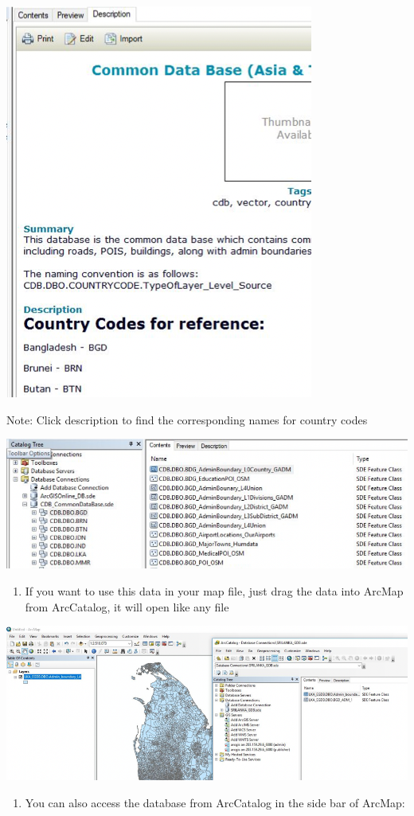 \documentclass[]{book}
\providecommand{\tightlist}{%
  \setlength{\itemsep}{0pt}\setlength{\parskip}{0pt}}
\theoremstyle{definition}
\theoremstyle{definition}
\theoremstyle{definition}
\theoremstyle{remark}
\begin{document}
\begin{center}\includegraphics[width=0.4\linewidth]{img/fig43_arcgis8b} \end{center}

Note: Click description to find the corresponding names for country
codes

\begin{center}\includegraphics[width=0.7\linewidth]{img/fig43_arcgis9} \end{center}

\begin{enumerate}
\def\labelenumi{\arabic{enumi}.}
\setcounter{enumi}{6}
\tightlist
\item
  If you want to use this data in your map file, just drag the data into
  ArcMap from ArcCatalog, it will open like any file
\end{enumerate}

\begin{center}\includegraphics[width=0.7\linewidth]{img/fig43_arcgis10} \end{center}

\begin{enumerate}
\def\labelenumi{\arabic{enumi}.}
\setcounter{enumi}{7}
\tightlist
\item
  You can also access the database from ArcCatalog in the side bar of
  ArcMap:
\end{enumerate}
\end{document}
